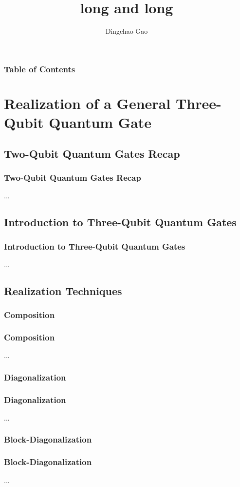\documentclass[aspectratio=1610]{beamer}
\title[]{long and long}
\author[Gcc]{Dingchao Gao}
\institute[ISCAS]{Institute of Software Chinese Academy of Sciences}
\begin{document}
\frame{\titlepage}

\begin{frame}
\frametitle{Table of Contents}
\tableofcontents[hideallsubsections]
\end{frame}


\section{Realization of a General Three-Qubit Quantum Gate}
\subsection{Two-Qubit Quantum Gates Recap}
\begin{frame}
\frametitle{Two-Qubit Quantum Gates Recap}
...
\end{frame}

\subsection{Introduction to Three-Qubit Quantum Gates}
\begin{frame}
\frametitle{Introduction to Three-Qubit Quantum Gates}
...
\end{frame}

\subsection{Realization Techniques}
\subsubsection{Composition}
\begin{frame}
\frametitle{Composition}
...
\end{frame}

\subsubsection{Diagonalization}
\begin{frame}
\frametitle{Diagonalization}
...
\end{frame}

\subsubsection{Block-Diagonalization}
\begin{frame}
\frametitle{Block-Diagonalization}
...
\end{frame}
\end{document}
